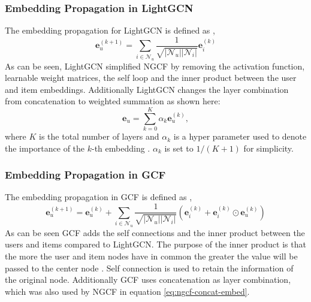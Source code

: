 \subsubsection{Embedding Propagation in LightGCN}\label{subsubsec:LightGCN-embed-propagation}
The embedding propagation for LightGCN is defined as \cite{lightgcn},
\begin{equation}
    \mathbf{e}_{u}^{(k+1)} = \sum^{}_{i \in \mathcal{N}_u} \frac{1}{\sqrt{|\mathcal{N}_u||\mathcal{N}_i|}} \mathbf{e}_i^{(k)}
\end{equation}
As can be seen, LightGCN simplified NGCF by removing the activation function, learnable weight matrices, the self loop and the inner product between the user and item embeddings.
Additionally LightGCN changes the layer combination from concatenation to weighted summation as shown here:
\begin{equation}
    \mathbf{e}_u = \sum_{k=0}^{K} \alpha_k \mathbf{e}_u^{(k)},
    \label{eq:lightgcn-sum}
\end{equation}
where $K$ is the total number of layers and $\alpha_k$ is a hyper parameter used to denote the importance of the $k$-th embedding \cite{lightgcn}.
$\alpha_k$ is set to $1 /(K + 1)$ for simplicity.

\subsubsection{Embedding Propagation in GCF}\label{subsubsec:GCF-embed-propagation}
The embedding propagation in GCF is defined as \cite{BiTGCF},
\begin{equation}
    \mathbf{e}_{u}^{(k+1)} = \mathbf{e}_{u}^{(k)} + \sum^{}_{i \in \mathcal{N}_u}  \frac{1}{\sqrt{|\mathcal{N}_u||\mathcal{N}_i|}}\left( \mathbf{e}_i^{(k)} + \mathbf{e}_i^{(k)} \odot \mathbf{e}_u^{(k)} \right)
    \label{eq:GCF-embedding}
\end{equation}
As can be seen GCF adds the self connections and the inner product between the users and items compared to LightGCN.
The purpose of the inner product is that the more the user and item nodes have in common the greater the value will be passed to the center node \cite{BiTGCF}.
Self connection is used to retain the information of the original node.
Additionally GCF uses concatenation as layer combination, which was also used by NGCF in equation \autoref{eq:ngcf-concat-embed}.
